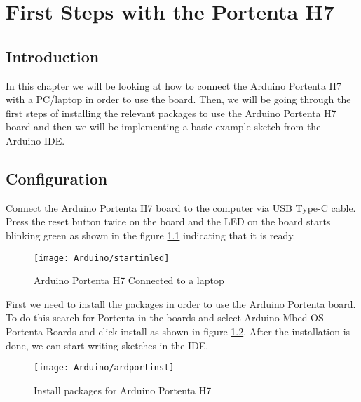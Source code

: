 %
%







\chapter{First Steps with the Portenta H7}

\section{Introduction}

In this chapter we will be looking at how to connect the Arduino Portenta H7 with a PC/laptop  in order to use the board. Then, we will be going through the first steps of installing the relevant packages to use the Arduino Portenta H7 board and then we will be implementing a basic example sketch from the Arduino IDE.

\section{Configuration}
Connect the Arduino Portenta H7 board to the computer via USB Type-C cable. Press the reset button twice on the board and the LED on the board starts blinking green as shown in the figure \ref{figure 5.1} indicating that it is ready.

\begin{figure}
	\centering
	\texttt{[image: Arduino/startinled]}
	\caption{Arduino Portenta H7 Connected to a laptop  }
	\label{figure 5.1}
\end{figure}
First we need to install the packages in order to use the Arduino Portenta board. To do this search for Portenta in the boards and select Arduino Mbed OS Portenta Boards and click install as shown in figure \ref{figure 5.2}. After the installation is done, we can start writing sketches in the IDE.
\begin{figure}[H]
	\centering
	\texttt{[image: Arduino/ardportinst]}
	\caption{Install packages for Arduino Portenta H7}
	\label{figure 5.2}
\end{figure}
